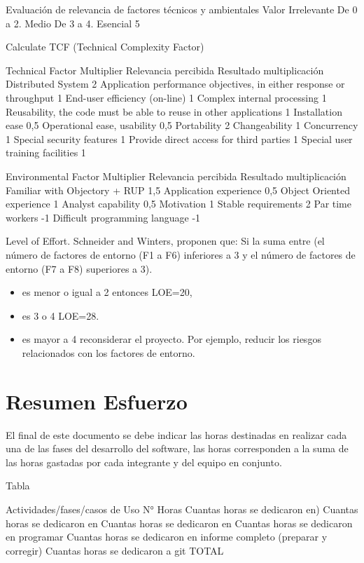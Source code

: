 Evaluación de relevancia de factores técnicos y ambientales     Valor
Irrelevante De                                                  0 a 2. 
Medio De                                                        3 a 4. 
Esencial                                                        5


Calculate TCF (Technical Complexity Factor)

Technical Factor    Multiplier      Relevancia percibida    Resultado multiplicación
Distributed System  2
Application performance objectives, in either response or throughput    1
End-user efficiency (on-line)   1
Complex internal processing     1
Reusability, the code must be able to reuse in other applications   1
Installation ease   0,5
Operational ease, usability     0,5
Portability     2
Changeability   1
Concurrency     1
Special security features   1
Provide direct access for third parties 1
Special user training facilities    1



Environmental Factor        Multiplier      Relevancia percibida    Resultado multiplicación
Familiar with Objectory + RUP   1,5         
Application experience          0,5
Object Oriented experience      1
Analyst capability              0,5
Motivation                      1
Stable requirements             2
Par time workers                -1
Difficult programming language  -1


Level of Effort. Schneider and Winters, proponen que: Si la suma entre (el número de factores de entorno (F1 a F6) inferiores a 3 y el número de factores de entorno (F7 a F8) superiores a 3). 
\begin{itemize}
    \item  es menor o igual a 2 entonces LOE=20, 
    \item  es 3 o 4 LOE=28. 
    \item  es mayor a 4 reconsiderar el proyecto. Por ejemplo, reducir los riesgos relacionados con los factores de entorno.
\end{itemize}


\section{Resumen Esfuerzo}

El final de este documento se debe indicar las horas destinadas en realizar cada una de las fases del desarrollo del software, las horas corresponden a la suma de las horas gastadas por cada integrante y del equipo en conjunto.

Tabla

Actividades/fases/casos de Uso          N° Horas
Cuantas horas se dedicaron en)          
Cuantas horas se dedicaron en           
Cuantas horas se dedicaron en           
Cuantas horas se dedicaron en programar 
Cuantas horas se dedicaron en informe completo (preparar y corregir)    
Cuantas horas se dedicaron a git        
TOTAL                           